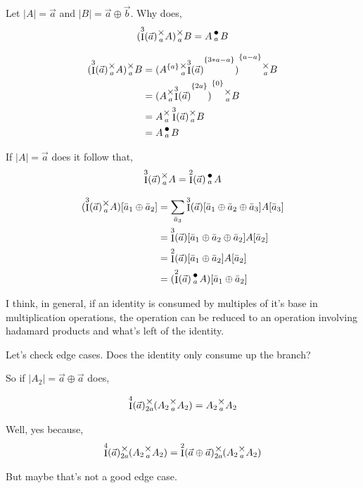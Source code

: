 \documentclass[12pt]{book}
\theoremstyle{plain}
\theoremstyle{definition}
\theoremstyle{ppart}
\theoremstyle{case}
\theoremstyle{solution}
\DeclareMathOperator{\Ident}{I}
\newcommand{\mmult}[1]{\text{\raisebox{1ex}{$\underset{#1}{\times}$}}}
\newcommand{\dmult}[1]{\text{\raisebox{1ex}{$\underset{#1}{\,\bullet\,}$}}}
\newcommand{\shape}[1]{\left|#1\right|}
\newcommand{\transpose}[2]{{#1}^{\{#2\}}}
\begin{document}
\begin{appendices}
\begin{landscape}
\pagebreak

Let $\shape{A} = \vec{a}$ and $\shape{B} = \vec{a} \oplus \vec{b}$. Why does,
\[ (\Ident^3(\vec{a}) \mmult{a} A) \mmult{a} B = A \dmult{a} B \]


\begin{align*}
  (\Ident^3(\vec{a}) \mmult{a} A) \mmult{a} B
  &=
  \transpose{(\transpose{A}{a} \mmult{a} \transpose{\Ident^3(\vec{a})}{3*a-a})}{a-a} \mmult{a} B \\
  &=
  \transpose{(A \mmult{a} \transpose{\Ident^3(\vec{a})}{2a})}{0} \mmult{a} B \\
  &=
  A \mmult{a} \Ident^3(\vec{a}) \mmult{a} B \\
  &=
  A \dmult{a} B
\end{align*}

\pagebreak

If $\shape{A} = \vec{a}$ does it follow that,
\[ \Ident^3(\vec{a}) \mmult{a} A = \Ident^2(\vec{a}) \dmult{a} A \]

\begin{align*}
  (\Ident^3(\vec{a}) \mmult{a} A)[\bar{a}_1 \oplus \bar{a}_2]
  &=
  \sum_{\bar{a}_3} \Ident^3(\vec{a})[\bar{a}_1 \oplus \bar{a}_2 \oplus \bar{a}_3] A[\bar{a}_3] \\
  &=
  \Ident^3(\vec{a})[\bar{a}_1 \oplus \bar{a}_2 \oplus \bar{a}_2] A[\bar{a}_2] \\
  &=
  \Ident^2(\vec{a})[\bar{a}_1 \oplus \bar{a}_2] A[\bar{a}_2] \\
  &=
  (\Ident^2(\vec{a}) \dmult{a} A)[\bar{a}_1 \oplus \bar{a}_2]
\end{align*}

\pagebreak

I think, in general, if an identity is consumed by multiples of it's base in multiplication operations, the operation can be reduced to an operation
involving hadamard products and what's left of the identity.

Let's check edge cases.  Does the identity only consume up the branch?

So if $\shape{A_2} = \vec{a} \oplus \vec{a}$ does,

\[ \Ident^4(\vec{a}) \mmult{2a} (A_2 \mmult{a} A_2)  = A_2 \mmult{a} A_2 \]

Well, yes because, 
\[ \Ident^4(\vec{a}) \mmult{2a} (A_2 \mmult{a} A_2)  = \Ident^2(\vec{a} \oplus \vec{a}) \mmult{2a} (A_2 \mmult{a} A_2) \]

But maybe that's not a good edge case.


\end{landscape}
\end{appendices}
\end{document}
